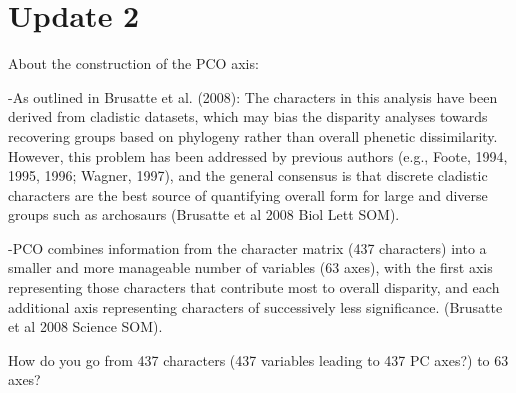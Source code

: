 \documentclass[a4paper,11pt]{article}
\begin{document}
\section{Update 2}
About the construction of the PCO axis:

-As outlined in Brusatte et al. (2008): The characters in this analysis have been derived from cladistic datasets, which may bias the disparity analyses towards recovering groups based on phylogeny rather than overall phenetic dissimilarity. However, this problem has been addressed by previous authors (e.g., Foote, 1994, 1995, 1996; Wagner, 1997), and the general consensus is that discrete cladistic characters are the best source of quantifying overall form for large and diverse groups such as archosaurs (Brusatte et al 2008 Biol Lett SOM).

-PCO combines information from the character matrix (437 characters) into a smaller and more manageable number of variables (63 axes), with the first axis representing those characters that contribute most to overall disparity, and each additional axis representing characters of successively less significance. (Brusatte et al 2008 Science SOM).

How do you go from 437 characters (437 variables leading to 437 PC axes?) to 63 axes?




\end{document}
